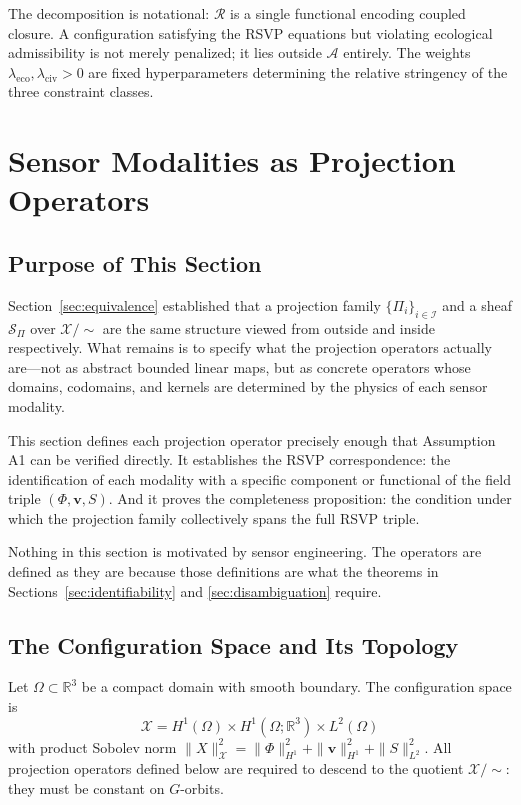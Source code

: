 \documentclass[12pt, oneside]{article}
\newcommand{\Xmod}{\mathcal{X}/{\sim}}
\begin{document}
The decomposition is notational: $\mathcal{R}$ is a single functional encoding coupled
closure. A configuration satisfying the RSVP equations but violating ecological
admissibility is not merely penalized; it lies outside $\mathcal{A}$ entirely. The
weights $\lambda_{\mathrm{eco}}, \lambda_{\mathrm{civ}} > 0$ are fixed hyperparameters
determining the relative stringency of the three constraint classes.

\section{Sensor Modalities as Projection Operators}
\label{sec:projections}

\subsection{Purpose of This Section}

Section~\ref{sec:equivalence} established that a projection family $\{\Pi_i\}_{i \in \mathcal{I}}$
and a sheaf $\mathcal{S}_\Pi$ over $\Xmod$ are the same structure viewed from outside and
inside respectively. What remains is to specify what the projection operators actually
are---not as abstract bounded linear maps, but as concrete operators whose domains,
codomains, and kernels are determined by the physics of each sensor modality.

This section defines each projection operator precisely enough that Assumption A1 can be
verified directly. It establishes the RSVP correspondence: the identification of each
modality with a specific component or functional of the field triple $(\Phi, \mathbf{v}, S)$.
And it proves the completeness proposition: the condition under which the projection family
collectively spans the full RSVP triple.

Nothing in this section is motivated by sensor engineering. The operators are defined as
they are because those definitions are what the theorems in Sections~\ref{sec:identifiability}
and \ref{sec:disambiguation} require.

\subsection{The Configuration Space and Its Topology}

Let $\Omega \subset \mathbb{R}^3$ be a compact domain with smooth boundary. The
configuration space is
\[
\mathcal{X} = H^1(\Omega) \times H^1(\Omega; \mathbb{R}^3) \times L^2(\Omega)
\]
with product Sobolev norm $\|X\|_{\mathcal{X}}^2 = \|\Phi\|_{H^1}^2 + \|\mathbf{v}\|_{H^1}^2 + \|S\|_{L^2}^2$.
All projection operators defined below are required to descend to the quotient $\Xmod$:
they must be constant on $G$-orbits.
\end{document}
